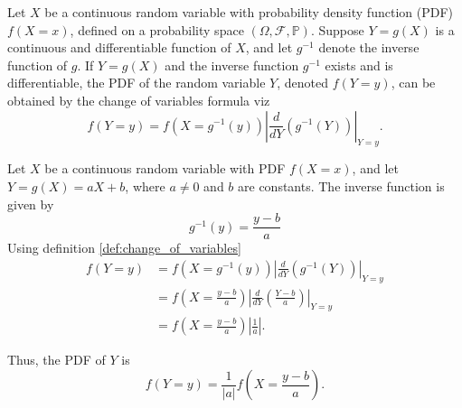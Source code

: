 \begin{definition}
	\label{def:change_of_variables}
	Let $X$ be a continuous random variable with probability density function (PDF) $f(X =x)$, defined on a probability space $(\Omega, \mathcal{F},\mathbb{P})$. Suppose $Y = g(X)$ is a continuous and differentiable function of $X$, and let $g^{-1}$ denote the inverse function of $g$. If $Y = g(X)$ and the inverse function $g^{-1}$ exists and is differentiable, the PDF of the random variable $Y$, denoted $f(Y=y)$, can be obtained by the change of variables formula viz~\cite{Sivia2006}
	\begin{equation}
		f(Y = y) = f(X = g^{-1}(y)) \left| \frac{d}{d Y} \left( g^{-1}(Y) \right) \right|_{Y=y}.
		\label{eq:change_of_variables}
	\end{equation}
\end{definition}

\begin{example}
	Let $X$ be a continuous random variable with PDF $f(X =x)$, and let $Y = g(X) = aX + b$, where $a \neq 0$ and $b$ are constants. The inverse function is given by
	\begin{equation}
		g^{-1}(y) = \frac{y - b}{a}
	\end{equation}
	Using definition \ref{def:change_of_variables}
	\begin{equation}
		\begin{split}
			f(Y=y) &= f\left( X = g^{-1}(y) \right) \left| \frac{d}{d Y} \left( g^{-1}(Y) \right) \right|_{Y=y} \\
			&= f\left(X =  \frac{y - b}{a} \right) \left| \frac{d}{d Y} \left( \frac{Y - b}{a} \right) \right|_{Y=y} \\
			&= f\left(X = \frac{y - b}{a} \right) \left| \frac{1}{a} \right|.
		\end{split}
	\end{equation}
	
	Thus, the PDF of $Y$ is
	\begin{equation}
		f(Y= y) = \frac{1}{|a|} f\left(X =  \frac{y - b}{a} \right).
	\end{equation}
\end{example}

